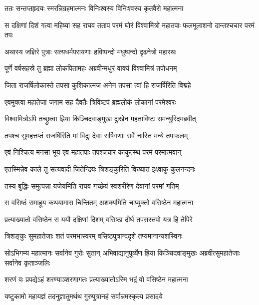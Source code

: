 
\twolineshloka
{ततः सन्तप्तहृदयः स्मरन्निग्रहमात्मनः}
{विनिःश्वस्य विनिःश्वस्य कृतवैरो महात्मना} %

\threelineshloka
{स दक्षिणां दिशं गत्वा महिष्या सह राघव}
{तताप परमं घोरं विश्वामित्रो महातपाः}
{फलमूलाशनो दान्तश्चचार परमं तपः} %

\twolineshloka
{अथास्य जज्ञिरे पुत्राः सत्यधर्मपरायणाः}
{हविष्पन्दो मधुष्पन्दो दृढनेत्रो महारथः} %

\twolineshloka
{पूर्णे वर्षसहस्रे तु ब्रह्मा लोकपितामहः}
{अब्रवीन्मधुरं वाक्यं विश्वामित्रं तपोधनम्} %

\twolineshloka
{जिता राजर्षिलोकास्ते तपसा कुशिकात्मज}
{अनेन तपसा त्वां हि राजर्षिरिति विद्महे} %

\twolineshloka
{एवमुक्त्वा महातेजा जगाम सह दैवतैः}
{त्रिविष्टपं ब्रह्मलोकं लोकानां परमेश्वरः} %

\twolineshloka
{विश्वामित्रोऽपि तच्छ्रुत्वा ह्रिया किञ्चिदवाङ्मुखः}
{दुःखेन महताविष्टः समन्युरिदमब्रवीत्} %

\twolineshloka
{तपश्च सुमहत्तप्तं राजर्षिरिति मां विदुः}
{देवाः सर्षिगणाः सर्वे नास्ति मन्ये तपःफलम्} %

\twolineshloka
{एवं निश्चित्य मनसा भूय एव महातपाः}
{तपश्चचार काकुत्स्थ परमं परमात्मवान्} %

\twolineshloka
{एतस्मिन्नेव काले तु सत्यवादी जितेन्द्रियः}
{त्रिशङ्कुरिति विख्यात इक्ष्वाकु कुलनन्दनः} %

\twolineshloka
{तस्य बुद्धिः समुत्पन्ना यजेयमिति राघव}
{गच्छेयं स्वशरीरेण देवानां परमां गतिम्} %

\twolineshloka
{स वसिष्ठं समाहूय कथयामास चिन्तितम्}
{अशक्यमिति चाप्युक्तो वसिष्ठेन महात्मना} %

\twolineshloka
{प्रत्याख्यातो वसिष्ठेन स ययौ दक्षिणां दिशम्}
{वसिष्ठा दीर्घ तपसस्तपो यत्र हि तेपिरे} %

\twolineshloka
{त्रिशङ्कुः सुमहातेजाः शतं परमभास्वरम्}
{वसिष्ठपुत्रान्ददृशे तप्यमानान्यशस्विनः} %

\threelineshloka
{सोऽभिगम्य महात्मानः सर्वानेव गुरोः सुतान्}
{अभिवाद्यानुपूर्व्येण ह्रिया किञ्चिदवाङ्मुखः}
{अब्रवीत्सुमहातेजाः सर्वानेव कृताञ्जलिः} %

\twolineshloka
{शरणं वः प्रपद्येऽहं शरण्याञ्शरणागतः}
{प्रत्याख्यातोऽस्मि भद्रं वो वसिष्ठेन महात्मना} %

\twolineshloka
{यष्टुकामो महायज्ञं तदनुज्ञातुमर्थथ}
{गुरुपुत्रानहं सर्वान्नमस्कृत्य प्रसादये} %

